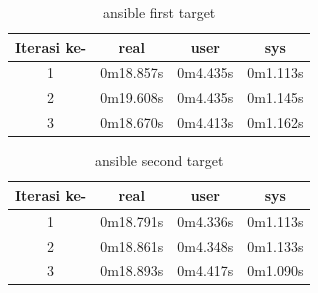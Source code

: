 \documentclass[10pt,twoside]{report}
\begin{document}
\begin{adjustwidth}{20pt}{}
	\begin{table}[H]
		\caption{ansible first target}
		\begin{center}
			\begin{tabular}[c]{|c|c|c|c|}
				\hline
				\multicolumn{1}{|c|}{\textbf{Iterasi ke-}} &
				\multicolumn{1}{c|}{\textbf{real}}         &
				\multicolumn{1}{c|}{\textbf{user}}         &
				\multicolumn{1}{c|}{\textbf{sys}}                                            \\
				\hline
				1                                          & 0m18.857s & 0m4.435s & 0m1.113s \\
				\hline
				2                                          & 0m19.608s & 0m4.435s & 0m1.145s \\
				\hline
				3                                          & 0m18.670s & 0m4.413s & 0m1.162s \\
				\hline
			\end{tabular}
		\end{center}
	\end{table}
	\vspace{-5mm}
	\begin{table}[H]
		\caption{ansible second target}
		\begin{center}
			\begin{tabular}[c]{|c|c|c|c|}
				\hline
				\multicolumn{1}{|c|}{\textbf{Iterasi ke-}} &
				\multicolumn{1}{c|}{\textbf{real}}         &
				\multicolumn{1}{c|}{\textbf{user}}         &
				\multicolumn{1}{c|}{\textbf{sys}}                                            \\
				\hline
				1                                          & 0m18.791s & 0m4.336s & 0m1.113s \\
				\hline
				2                                          & 0m18.861s & 0m4.348s & 0m1.133s \\
				\hline
				3                                          & 0m18.893s & 0m4.417s & 0m1.090s \\
				\hline
			\end{tabular}
		\end{center}
	\end{table}

\end{adjustwidth}
\end{document}
